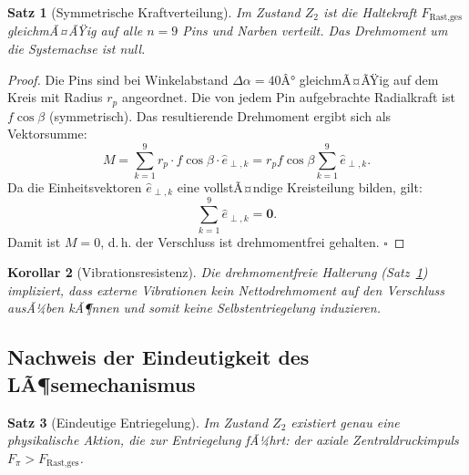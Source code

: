 ﻿\documentclass[12pt, a4paper]{article}
\newtheorem{theorem}{Satz}[section]
\newtheorem{corollary}[theorem]{Korollar}
\theoremstyle{remark}
\newcommand{\vvec}[1]{\boldsymbol{#1}}
\begin{document}
\begin{theorem}[Symmetrische Kraftverteilung]
  \label{thm:symmetrie}
  Im Zustand $Z_2$ ist die Haltekraft $F_{\text{Rast,ges}}$ gleichmÃ¤ÃŸig auf alle $n = 9$
  Pins und Narben verteilt. Das Drehmoment um die Systemachse ist null.
\end{theorem}

\begin{proof}
  Die Pins sind bei Winkelabstand $\Delta\alpha = 40Â°$ gleichmÃ¤ÃŸig auf dem Kreis mit
  Radius $r_p$ angeordnet. Die von jedem Pin aufgebrachte Radialkraft ist $f \cos\beta$ (symmetrisch).
  Das resultierende Drehmoment ergibt sich als Vektorsumme:
  \[
    M = \sum_{k=1}^{9} r_p \cdot f\cos\beta \cdot \hat{e}_{\perp,k}
      = r_p f\cos\beta \sum_{k=1}^{9} \hat{e}_{\perp,k}.
  \]
  Da die Einheitsvektoren $\hat{e}_{\perp,k}$ eine vollstÃ¤ndige Kreisteilung bilden, gilt:
  \[
    \sum_{k=1}^{9} \hat{e}_{\perp,k} = \vvec{0}.
  \]
  Damit ist $M = 0$, d.\,h. der Verschluss ist drehmomentfrei gehalten. $\square$
\end{proof}

\begin{corollary}[Vibrationsresistenz]
  Die drehmomentfreie Halterung (Satz~\ref{thm:symmetrie}) impliziert, dass externe
  Vibrationen kein Nettodrehmoment auf den Verschluss ausÃ¼ben kÃ¶nnen und somit keine
  Selbstentriegelung induzieren.
\end{corollary}

\subsection{Nachweis der Eindeutigkeit des LÃ¶semechanismus}

\begin{theorem}[Eindeutige Entriegelung]
  \label{thm:einheit}
  Im Zustand $Z_2$ existiert genau eine physikalische Aktion, die zur Entriegelung fÃ¼hrt:
  der axiale Zentraldruckimpuls $F_\pi > F_{\text{Rast,ges}}$.
\end{theorem}
\end{document}
